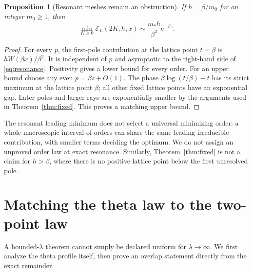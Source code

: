 \documentclass[11pt,a4paper]{article}
\numberwithin{equation}{section}
\newtheorem{proposition}[theorem]{Proposition}
\theoremstyle{definition}\newtheorem{definition}[theorem]{Definition}
\theoremstyle{remark}\newtheorem{remark}[theorem]{Remark}
\newcommand{\e}{\mathrm e}
\newcommand{\mstar}{m_*}
\newcommand{\calE}{\mathcal E}
\begin{document}
\begin{proposition}[Resonant meshes remain an obstruction]
\label{prop:resonance}
If $h=\beta/m_0$ for an integer $m_0\ge1$, then
\begin{equation}
 \min_{K\ge0}\calE_L(2K;h,x)
 \sim\frac{\mstar h}{\beta^2}\e^{-\beta z}.
 \label{eq:resonance}
\end{equation}
\end{proposition}
\begin{proof}
For every $p$, the first-pole contribution at the lattice point $t=\beta$
is $hW(\beta x)/\beta^2$. It is independent of $p$ and asymptotic to the
right-hand side of \eqref{eq:resonance}. Positivity gives a lower bound
for every order. For an upper bound choose any even $p=\beta z+O(1)$.
The phase $\beta\log(t/\beta)-t$ has its strict maximum at the lattice
point $\beta$; all other fixed lattice points have an exponential gap.
Later poles and larger rays are exponentially smaller by the arguments
used in Theorem~\ref{thm:fixed}. This proves a matching upper bound.
\end{proof}

The resonant leading minimum does not select a universal minimizing order:
a whole macroscopic interval of orders can share the same leading
irreducible contribution, with smaller terms deciding the optimum.
We do not assign an unproved order law at exact resonance. Similarly,
Theorem~\ref{thm:fixed} is not a claim for $h>\beta$, where there is no
positive lattice point below the first unresolved pole.

\section{Matching the theta law to the two-point law}
\label{sec:matching}

A bounded-$\lambda$ theorem cannot simply be declared uniform for
$\lambda\to\infty$. We first analyze the theta profile itself, then prove
an overlap statement directly from the exact remainder.
\end{document}
